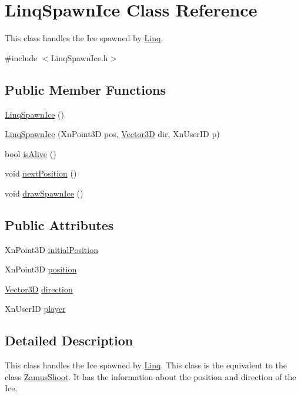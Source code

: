\hypertarget{classLinqSpawnIce}{
\section{LinqSpawnIce Class Reference}
\label{classLinqSpawnIce}
}


This class handles the Ice spawned by \hyperlink{classLinq}{Linq}.  




{\ttfamily \#include $<$LinqSpawnIce.h$>$}

\subsection*{Public Member Functions}
\begin{DoxyCompactItemize}
\item 
\hyperlink{classLinqSpawnIce_a2cc89b811caf7c8e5e70bd95448e4440}{LinqSpawnIce} ()
\item 
\hyperlink{classLinqSpawnIce_a77656fb466afa730c8e1b885c6d2b78b}{LinqSpawnIce} (XnPoint3D pos, \hyperlink{classVector3D}{Vector3D} dir, XnUserID p)
\item 
bool \hyperlink{classLinqSpawnIce_a105bc2e17ead7417ab2f913b246db5d0}{isAlive} ()
\item 
void \hyperlink{classLinqSpawnIce_aa4db7809c414481a0e1ca7c2241af01d}{nextPosition} ()
\item 
void \hyperlink{classLinqSpawnIce_a07a8f94c11e0330e2cc4707c56f5cf6d}{drawSpawnIce} ()
\end{DoxyCompactItemize}
\subsection*{Public Attributes}
\begin{DoxyCompactItemize}
\item 
XnPoint3D \hyperlink{classLinqSpawnIce_a0ffb74516ffb532b8ba0184f88b5f642}{initialPosition}
\item 
XnPoint3D \hyperlink{classLinqSpawnIce_ad6c2e52cc6a9b88a3c089ae191939e13}{position}
\item 
\hyperlink{classVector3D}{Vector3D} \hyperlink{classLinqSpawnIce_a2da782100e9d1c549ea3b4c8cbadc2cb}{direction}
\item 
XnUserID \hyperlink{classLinqSpawnIce_aece9d500d9248dd9e6fe51b3ed1a7f6d}{player}
\end{DoxyCompactItemize}


\subsection{Detailed Description}
This class handles the Ice spawned by \hyperlink{classLinq}{Linq}. This class is the equivalent to the class \hyperlink{classZamusShoot}{ZamusShoot}. It has the information about the position and direction of the Ice. 

